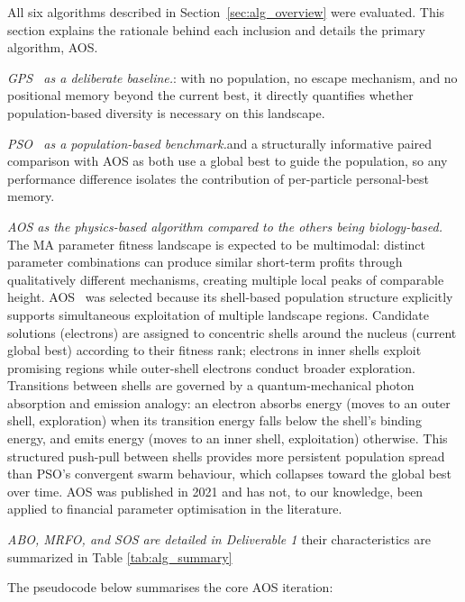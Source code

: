 \label{sec:algo_select}

All six algorithms described in Section~\ref{sec:alg_overview} were
evaluated. This section explains the rationale behind each inclusion and
details the primary algorithm, AOS.

\textit{GPS~\cite{torczon1997} as a deliberate baseline.}: with no population, no escape mechanism, 
and no positional memory beyond the current best, it directly quantifies whether 
population-based diversity is necessary on this landscape.

\textit{PSO~\cite{shi1998} as a population-based benchmark.}and a structurally informative 
paired comparison with AOS as both use a global best to guide the population, 
so any performance difference isolates the contribution of per-particle personal-best memory.

\textit{AOS as the physics-based algorithm compared to the others being
biology-based.} The MA parameter fitness landscape is
expected to be multimodal: distinct parameter combinations can produce
similar short-term profits through qualitatively different mechanisms,
creating multiple local peaks of comparable height. AOS~\cite{azizi2021} was
selected because its shell-based population structure explicitly supports
simultaneous exploitation of multiple landscape regions. Candidate solutions
(electrons) are assigned to concentric shells around the nucleus (current
global best) according to their fitness rank; electrons in inner shells
exploit promising regions while outer-shell electrons conduct broader
exploration. Transitions between shells are governed by a quantum-mechanical
photon absorption and emission analogy: an electron absorbs energy (moves to
an outer shell, exploration) when its transition energy falls below the
shell's binding energy, and emits energy (moves to an inner shell,
exploitation) otherwise. This structured push-pull between shells provides
more persistent population spread than PSO's convergent swarm behaviour,
which collapses toward the global best over time. AOS was published in 2021
and has not, to our knowledge, been applied to financial parameter
optimisation in the literature.

\textit{ABO, MRFO, and SOS are detailed in Deliverable 1} their characteristics
are summarized in Table \ref{tab:alg_summary}

The pseudocode below summarises the core AOS iteration:

